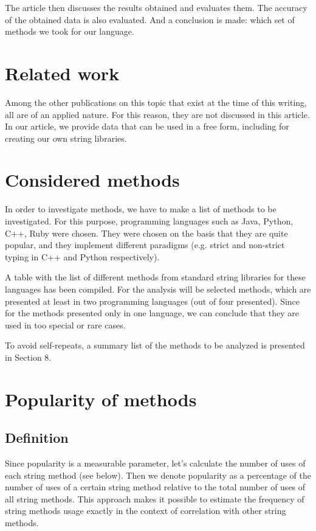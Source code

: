 \documentclass[anonymous,sigplan,review,11pt,nonacm,natbib=false]{acmart}
\begin{document}
The article then discusses the results obtained and evaluates them. The accuracy of the obtained data is also evaluated. And a conclusion is made: which set of methods we took for our language.

\section{Related work}

Among the other publications on this topic that exist at the time of this writing, all are of an applied nature. For this reason, they are not discussed in this article. In our article, we provide data that can be used in a free form, including for creating our own string libraries.

\section{Considered methods}

In order to investigate methods, we have to make a list of methods to be investigated. For this purpose, programming languages such as Java, Python, C++, Ruby were chosen. They were chosen on the basis that they are quite popular, and they implement different paradigms (e.g. strict and non-strict typing in C++ and Python respectively).

A table with the list of different methods from standard string libraries for these languages has been compiled. For the analysis will be selected methods, which are presented at least in two programming languages (out of four presented). Since for the methods presented only in one language, we can conclude that they are used in too special or rare cases.

To avoid self-repeats, a summary list of the methods to be analyzed is presented in Section 8.

\section{Popularity of methods}

\subsection{Definition}

Since popularity is a measurable parameter, let's calculate the number of uses of each string method (see below). Then we denote popularity as a percentage of the number of uses of a certain string method relative to the total number of uses of all string methods. This approach makes it possible to estimate the frequency of string methods usage exactly in the context of correlation with other string methods.
\end{document}
